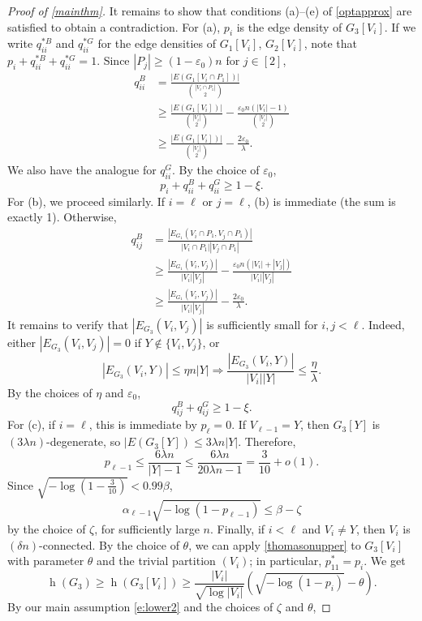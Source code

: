 \documentclass{article}
\newcommand{\eps}{\varepsilon}
\newcommand{\s}[1]{\left(#1\right)}
\DeclareMathOperator{\had}{h}
\begin{document}
\begin{proof}[Proof of \cref{mainthm}]
It remains to show that conditions (a)--(e) of \cref{optapprox} are satisfied to obtain a contradiction.
For (a), $p_i$ is the edge density of $G_3[V_i]$. If we write $q_{ii}^{*B}$ and $q_{ii}^{*G}$ for the  edge densities of $G_1[V_i]$, $G_2[V_i]$, note that $p_i + q_{ii}^{*B} + q_{ii}^{*G} = 1$. Since $|P_j| \geq (1-\eps_0)n$ for $j \in [2]$,
\begin{align*}
q^{B}_{ii} & = \frac{|E(G_1[V_i \cap P_1])|}{\binom{|V_i \cap P_1|}2} \\
& \geq \frac{|E(G_1[V_i])|}{\binom{|V_i|}2} - \frac{ \eps_0n(|V_i|-1)}{\binom{|V_i|}2} \\
&\geq \frac{|E(G_1[V_i])|}{\binom{|V_i|}2} - \frac{2\eps_0}{\lambda}.
\end{align*}
We also have the analogue for $q_{ii}^G$. By the choice of $\eps_0$,
$$p_i + q_{ii}^B + q_{ii}^G \geq 1 - \xi.$$
For (b), we proceed similarly. If $i = \ell$ or $j = \ell$, (b) is immediate (the sum is exactly 1). Otherwise,
\begin{align*}
q^{B}_{ij} &= \frac{|E_{G_1}(V_i \cap P_1,V_j \cap P_1)|}{|V_i \cap P_1||V_j \cap P_1|} \\
& \geq \frac{|E_{G_1}(V_i,V_j)|}{|V_i||V_j|} - \frac{\eps_0 n (|V_i| + |V_j|)}{|V_i||V_j|} \\
& \geq \frac{|E_{G_1}(V_i,V_j)|}{|V_i||V_j|} - \frac{2 \eps_0}\lambda.
\end{align*}
It remains to verify that $|E_{G_3}(V_i,V_j)|$ is sufficiently small for $i, j < \ell$. Indeed, either $|E_{G_3}(V_i,V_j)| = 0$ if $Y \not\in \{V_i, V_j\}$, or
$$|E_{G_3}(V_i,Y)| \leq \eta n |Y| \Rightarrow \frac{|E_{G_3}(V_i,Y)|}{|V_i||Y|} \leq \frac{\eta}{\lambda}.$$
By the choices of $\eta$ and $\eps_0$,
$$q_{ij}^B + q_{ij}^G \geq 1 - \xi.$$
For (c), if $i = \ell$, this is immediate by $p_\ell = 0$. If $V_{\ell-1} = Y$, then $G_3[Y]$ is $(3 \lambda n)$-degenerate, so $|E(G_3[Y]) \leq 3 \lambda n |Y|$. Therefore, $$p_{\ell-1} \leq \frac{6 \lambda n}{|Y| - 1} \leq \frac{6 \lambda n}{20 \lambda n - 1} = \frac3{10} + o(1).$$
Since $\sqrt{-\log\s{1-\frac3{10}}} < 0.99\beta$,
$$\alpha_{\ell-1} \sqrt{-\log(1-p_{\ell-1})} \leq \beta - \zeta$$
by the choice of $\zeta$, for sufficiently large $n$. Finally, if $i < \ell$ and $V_i \neq Y$, then $V_i$ is $(\delta n)$-connected. By the choice of $\theta$, we can apply \cref{thomasonupper} to $G_3[V_i]$ with parameter $\theta$ and the trivial partition $(V_i)$; in particular, $p^*_{11} = p_i$. We get
$$\had(G_3) \geq \had(G_3[V_i]) \geq \frac{|V_i|}{\sqrt{\log |V_i|}} \s{\sqrt{-\log\s{1-p_i}} - \theta}.$$
By our main assumption \eqref{e:lower2} and the choices of $\zeta$ and $\theta$,

\end{proof}
\end{document}
